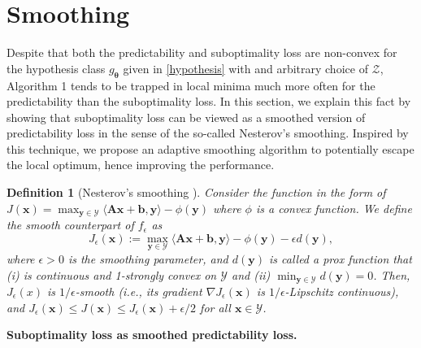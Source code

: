 \documentclass{article}
\def\x{\bm{x}}
\def\y{\bm{y}}
\def\b{\bm{b}}
\theoremstyle{plain}
\newtheorem{definition}[theorem]{Definition}
\begin{document}
\section{Smoothing} \label{app:smoothing}

Despite that both the predictability and suboptimality loss are non-convex for the hypothesis class $g_{\bm\theta}$ given in \eqref{hypothesis} with and arbitrary choice of $\mathcal{Z}$, Algorithm 1 tends to be trapped in local minima much more often for the predictability than the suboptimality loss. In this section, we explain this fact by showing that suboptimality loss can be viewed as a smoothed version of predictability loss in the sense of the so-called Nesterov's smoothing. Inspired by this technique, we propose an adaptive smoothing algorithm to potentially escape the local optimum, hence improving the performance.

\begin{definition}[Nesterov’s smoothing \cite{nesterov2018lectures}]\label{def:Nesterov smoothing}
Consider the function in the form of $J(\x) = \max_{\y \in \mathcal{Y}} \langle \bm A\x+\b, \y \rangle - \phi(\y)$ where $\phi$ is a convex function. We define the smooth counterpart of $f_\epsilon$ as
$$J_\epsilon(\x) := \max_{\y \in \mathcal{Y}} \langle \bm A\x+\b, \y \rangle - \phi(\y) - \epsilon d(\y),$$
where $\epsilon >0$ is the smoothing parameter, and $d(\y)$ is called a prox function that (i) is continuous and 1-strongly convex on $\mathcal{Y}$ and (ii) $\min_{\y \in \mathcal{Y}}d(\y)=0$. Then, $J_\epsilon(x)$ is $1/\epsilon$-smooth (i.e., its gradient $\nabla J_\epsilon(\x)$ is $1/\epsilon$-Lipschitz continuous), and  $J_\epsilon(\x) \le J(\x) \le J_\epsilon(\x)+\epsilon/2$ for all $\x \in \mathcal{Y}$. 
\end{definition}

{\bf Suboptimality loss as smoothed predictability loss.}
\end{document}

